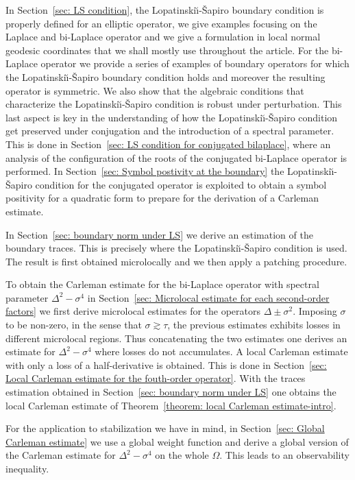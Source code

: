 \documentclass[JEP,XML,SOM,Unicode,published]{cedram}
\theoremstyle{plain}
\theoremstyle{definition}
\newcommand{\LS}{Lopatinski\u{\i}-\v{S}apiro\xspace}
\begin{document}
In Section~\ref{sec: LS condition}, the \LS boundary condition is
properly defined for an elliptic operator, we give examples focusing
on the Laplace and bi-Laplace operator and we give a formulation in
local normal geodesic coordinates that we shall mostly use throughout
the article. For the bi-Laplace operator we provide a series of
examples of boundary operators for which the \LS boundary condition
holds and moreover the resulting operator is symmetric. We also show
that the algebraic conditions that characterize the \LS condition is
robust under perturbation. This last aspect is key in the
understanding of how the \LS condition get preserved under conjugation
and the introduction of a spectral parameter. This is done in
Section~\ref{sec: LS condition for conjugated bilaplace}, where an
analysis of the configuration of the roots of the conjugated
bi-Laplace operator is performed. In Section~\ref{sec: Symbol postivity at the boundary} the \LS condition for the conjugated
operator is exploited to obtain a symbol positivity for a quadratic
form to prepare for the derivation of a Carleman estimate.

In Section~\ref{sec: boundary norm under LS} we derive an estimation of
the boundary traces. This is precisely where the \LS condition is
used. The result is first obtained microlocally and we then apply a
patching procedure.

To obtain the Carleman estimate for the bi-Laplace operator with
spectral parameter $\Delta^2 - \sigma^4$ in Section~\ref{sec: Microlocal estimate for each second-order factors} we first
derive microlocal estimates for the operators $\Delta \pm \sigma^2$.
Imposing $\sigma$ to be non-zero, in the sense that $\sigma \gtrsim
\tau$, the previous estimates exhibits losses in different microlocal
regions. Thus concatenating the two estimates one derives an estimate
for $\Delta^2 - \sigma^4$ where losses do not accumulates. A local Carleman
estimate with only a loss of a half-derivative is obtained. This is
done in Section~\ref{sec: Local Carleman estimate for the fouth-order operator}. With the traces estimation obtained in Section~\ref{sec:
boundary norm under LS} one obtains the local Carleman estimate of
Theorem~\ref{theorem: local Carleman estimate-intro}.

For the application to stabilization we have in mind, in
Section~\ref{sec: Global Carleman estimate} we use a global weight
function and derive a global version of the Carleman estimate for
$\Delta^2 - \sigma^4$ on the whole $\Omega$.
This leads to an observability inequality.
\end{document}
